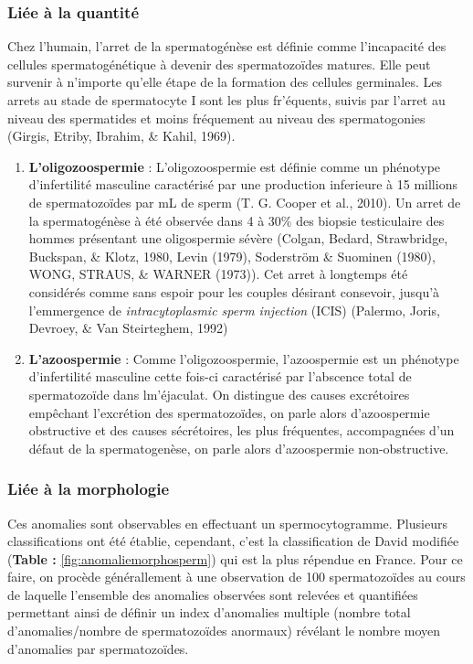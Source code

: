 \documentclass[12pt,twoside]{reedthesis}
\providecommand{\tightlist}{%
  \setlength{\itemsep}{0pt}\setlength{\parskip}{0pt}}
\theoremstyle{definition}
\theoremstyle{definition}
\theoremstyle{remark}
\begin{document}
  \subsubsection{Liée à la quantité}\label{liee-a-la-quantite}
  
  Chez l'humain, l'arret de la spermatogénèse est définie comme
  l'incapacité des cellules spermatogénétique à devenir des spermatozoïdes
  matures. Elle peut survenir à n'importe qu'elle étape de la formation
  des cellules germinales. Les arrets au stade de spermatocyte I sont les
  plus fr'équents, suivis par l'arret au niveau des spermatides et moins
  fréquement au niveau des spermatogonies (Girgis, Etriby, Ibrahim, \&
  Kahil, 1969).
  
  \begin{enumerate}
  \def\labelenumi{\arabic{enumi}.}
  \tightlist
  \item
    \textbf{L'oligozoospermie} : L'oligozoospermie est définie comme un
    phénotype d'infertilité masculine caractérisé par une production
    inferieure à 15 millions de spermatozoïdes par mL de sperm (T. G.
    Cooper et al., 2010). Un arret de la spermatogénèse à été observée
    dans 4 à 30\% des biopsie testiculaire des hommes présentant une
    oligospermie sévère (Colgan, Bedard, Strawbridge, Buckspan, \& Klotz,
    1980, Levin (1979), Soderström \& Suominen (1980), WONG, STRAUS, \&
    WARNER (1973)). Cet arret à longtemps été considérés comme sans espoir
    pour les couples désirant consevoir, jusqu'à l'emmergence de
    \emph{intracytoplasmic sperm injection} (ICIS) (Palermo, Joris,
    Devroey, \& Van Steirteghem, 1992)\\
  \item
    \textbf{L'azoospermie} : Comme l'oligozoospermie, l'azoospermie est un
    phénotype d'infertilité masculine cette fois-ci caractérisé par
    l'abscence total de spermatozoïde dans lm'éjaculat. On distingue des
    causes excrétoires empêchant l'excrétion des spermatozoïdes, on parle
    alors d'azoospermie obstructive et des causes sécrétoires, les plus
    fréquentes, accompagnées d'un défaut de la spermatogenèse, on parle
    alors d'azoospermie non-obstructive.
  \end{enumerate}
  
  \subsubsection{Liée à la morphologie}\label{liee-a-la-morphologie}
  
  Ces anomalies sont observables en effectuant un spermocytogramme.
  Plusieurs classifications ont été établie, cependant, c'est la
  classification de David modifiée (\textbf{Table :}
  \ref{fig:anomaliemorphosperm}) qui est la plus répendue en France. Pour
  ce faire, on procède générallement à une observation de 100
  spermatozoïdes au cours de laquelle l'ensemble des anomalies observées
  sont relevées et quantifiées permettant ainsi de définir un index
  d'anomalies multiple (nombre total d'anomalies/nombre de spermatozoïdes
  anormaux) révélant le nombre moyen d'anomalies par spermatozoïdes.
  
\end{document}
